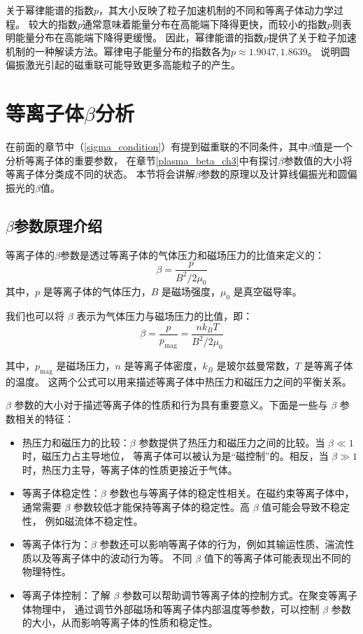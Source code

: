 关于幂律能谱的指数$p$，其大小反映了粒子加速机制的不同和等离子体动力学过程。
较大的指数$p$通常意味着能量分布在高能端下降得更快，而较小的指数$p$则表明能量分布在高能端下降得更缓慢。
因此，幂律能谱的指数$p$提供了关于粒子加速机制的一种解读方法。幂律电子能量分布的指数各为$p\approx 1.9047, 1.8639$。
说明圆偏振激光引起的磁重联可能导致更多高能粒子的产生。

\section[\textnormal{等离子体$\beta$分析}]{\textbf{等离子体$\beta$分析}}
在前面的章节中（\ref{sigma_condition}）有提到磁重联的不同条件，其中$\beta$值是一个分析等离子体的重要参数，
在章节\ref{plasma_beta_ch3}中有探讨$\beta$参数值的大小将等离子体分类成不同的状态。
本节将会讲解$\beta$参数的原理以及计算线偏振光和圆偏振光的$\beta$值。

\subsection[\textnormal{$\beta$参数原理介绍}]{\textbf{$\beta$参数原理介绍}}

等离子体的$\beta$参数是透过等离子体的气体压力和磁场压力的比值来定义的：
\begin{equation}
    \beta=\frac p{B^2/2\mu_0}
\end{equation}
其中，$p$ 是等离子体的气体压力，$B$ 是磁场强度，$\mu_0$ 是真空磁导率。

我们也可以将 $\beta$ 表示为气体压力与磁场压力的比值，即：
\begin{equation}
    \beta=\frac{p}{p_{\mathrm{mag}}}=\frac{nk_{B}T}{B^2/2\mu_0}
    \label{eq:beta_calculation_equation}
\end{equation}

其中，$p_{\mathrm{mag}}$ 是磁场压力，$n$ 是等离子体密度，$k_{B}$ 是玻尔兹曼常数，$T$ 是等离子体的温度。
这两个公式可以用来描述等离子体中热压力和磁压力之间的平衡关系。

$\beta$ 参数的大小对于描述等离子体的性质和行为具有重要意义。下面是一些与 $\beta$ 参数相关的特征：
\begin{itemize}
    \item 热压力和磁压力的比较：$\beta$ 参数提供了热压力和磁压力之间的比较。当 $\beta \ll 1$ 时，磁压力占主导地位，
    等离子体可以被认为是“磁控制”的。相反，当 $\beta \gg 1$ 时，热压力主导，等离子体的性质更接近于气体\cite{schwartz2004astrophysical}。    
    \item 等离子体稳定性：$\beta$ 参数也与等离子体的稳定性相关。在磁约束等离子体中，
    通常需要 $\beta$ 参数较低才能保持等离子体的稳定性\cite{miyamoto2016plasma}。高 $\beta$ 值可能会导致不稳定性，
    例如磁流体不稳定性。    
    \item 等离子体行为：$\beta$ 参数还可以影响等离子体的行为，例如其输运性质、湍流性质以及等离子体中的波动行为等。
    不同 $\beta$ 值下的等离子体可能表现出不同的物理特性。    
    \item 等离子体控制：了解 $\beta$ 参数可以帮助调节等离子体的控制方式。在聚变等离子体物理中，
    通过调节外部磁场和等离子体内部温度等参数\cite{miyamoto2016plasma}，可以控制 $\beta$ 参数的大小，从而影响等离子体的性质和稳定性。    
\end{itemize}

